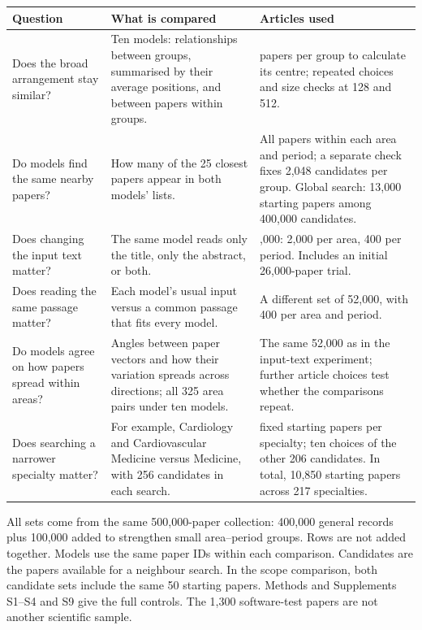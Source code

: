\begin{table}[!htbp]
\par\noindent\begin{minipage}{\linewidth}
\small
\setlength{\tabcolsep}{4pt}
\renewcommand{\arraystretch}{1.10}
\label{tab:T01}
\begin{tabular}{@{}>{\raggedright\arraybackslash}p{4.0cm}>{\raggedright\arraybackslash}p{5.4cm}>{\raggedright\arraybackslash}p{5.75cm}@{}}
\toprule
\textbf{Question} & \textbf{What is compared} & \textbf{Articles used} \\
\midrule
Does the broad arrangement stay similar? & Ten models: relationships between groups, summarised by their average positions, and between papers within groups. & 256 papers per group to calculate its centre; repeated choices and size checks at 128 and 512. \\
\addlinespace[8pt]
Do models find the same nearby papers? & How many of the 25 closest papers appear in both models' lists. & All papers within each area and period; a separate check fixes 2,048 candidates per group. Global search: 13,000 starting papers among 400,000 candidates. \\
\addlinespace[8pt]
Does changing the input text matter? & The same model reads only the title, only the abstract, or both. & 52,000: 2,000 per area, 400 per period. Includes an initial 26,000-paper trial. \\
\addlinespace[8pt]
Does reading the same passage matter? & Each model's usual input versus a common passage that fits every model. & A different set of 52,000, with 400 per area and period. \\
\addlinespace[8pt]
Do models agree on how papers spread within areas? & Angles between paper vectors and how their variation spreads across directions; all 325 area pairs under ten models. & The same 52,000 as in the input-text experiment; further article choices test whether the comparisons repeat. \\
\addlinespace[8pt]
Does searching a narrower specialty matter? & For example, Cardiology and Cardiovascular Medicine versus Medicine, with 256 candidates in each search. & 50 fixed starting papers per specialty; ten choices of the other 206 candidates. In total, 10,850 starting papers across 217 specialties. \\
\bottomrule
\end{tabular}
\par\smallskip
All sets come from the same 500,000-paper collection: 400,000 general records plus 100,000 added to strengthen small area--period groups. Rows are not added together. Models use the same paper IDs within each comparison. Candidates are the papers available for a neighbour search. In the scope comparison, both candidate sets include the same 50 starting papers. Methods and Supplements S1--S4 and S9 give the full controls. The 1,300 software-test papers are not another scientific sample.
\end{minipage}\par
\end{table}
